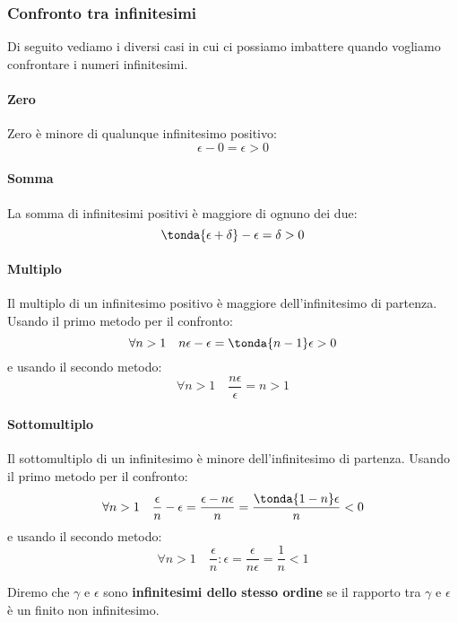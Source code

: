 \newpage %

\subsubsection{Confronto tra infinitesimi}
\label{subsubsec:insnum_confrontoreali}

Di seguito vediamo i diversi casi in cui ci possiamo 
imbattere quando vogliamo confrontare i numeri infinitesimi.

\paragraph{Zero}
Zero è minore di qualunque infinitesimo positivo:
\[\epsilon-0 = \epsilon>0\]
\paragraph{Somma}
La somma di infinitesimi positivi è maggiore di ognuno dei due:
\[\tonda{\epsilon+\delta}-\epsilon = \delta > 0\]
\paragraph{Multiplo}
Il multiplo di un infinitesimo positivo è maggiore dell'infinitesimo di 
partenza. Usando il primo metodo per il confronto:
\[\forall n > 1 \quad n\epsilon-\epsilon = \tonda{n-1}\epsilon > 0\]
e usando il secondo metodo: 
\[\forall n > 1 \quad \frac{n\epsilon}{\epsilon} = n > 1\]
\paragraph{Sottomultiplo}
Il sottomultiplo di un infinitesimo è minore dell'infinitesimo di partenza. 
Usando il primo metodo per il confronto:
\[\forall n > 1 \quad \frac{\epsilon}{n}-\epsilon = 
                      \frac{\epsilon-n\epsilon}{n} = 
                      \frac{\tonda{1-n}\epsilon}{n} < 0\]
e usando il secondo metodo: 
\[\forall n > 1 \quad \frac{\epsilon}{n}:\epsilon =
                      \frac{\epsilon}{n\epsilon} =
                      \frac{1}{n} < 1\]
\begin{definizione}
 Diremo che \(\gamma\) e \(\epsilon\) sono \textbf{infinitesimi dello 
stesso ordine} se il rapporto tra \(\gamma\) e \(\epsilon\) è un 
finito non infinitesimo.
\end{definizione}
